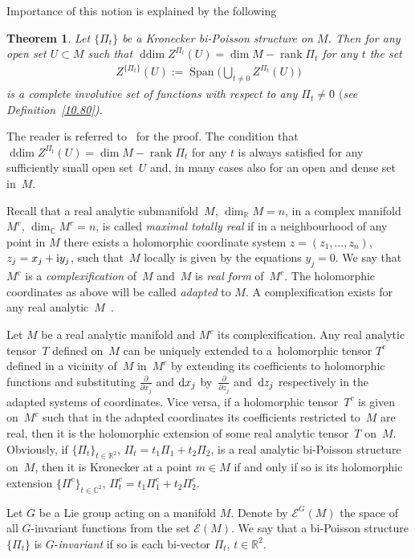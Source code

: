 \documentclass[pdftex]{sigma}
\numberwithin{equation}{section}
\newtheorem{Theorem}{Theorem}[section]
\begin{document}
Importance of this notion is explained by the following

\begin{Theorem}\label{prop}Let $\{\Pi_t\}$ be a Kronecker bi-Poisson structure on $M$. Then for any open set $U \subset M$ such that $\operatorname{ddim} Z^{\Pi_t}(U)=\dim M-\operatorname{rank} \Pi_t$ for any $t$ the set
\begin{gather*}
Z^{\{\Pi_t\}}(U):=\operatorname{Span}\bigg(\bigcup_{t\not=0}Z^{\Pi_t}(U)\bigg)
\end{gather*}
is a complete involutive set of functions with respect to any $\Pi_t\not =0$ $($see Definition~{\rm \ref{10.80})}.
\end{Theorem}
The reader is referred to~\cite{bols'} for the proof. The condition that $\operatorname{ddim} Z^{\Pi_t}(U)=\dim M-\operatorname{rank} \Pi_t$ for any $t$ is always satisfied for any sufficiently small open set~$U$ and, in many cases also for an open and dense set in~$M$.

\begin{Remark}\label{rem}Recall that a real analytic submanifold~$M$, $\dim_\mathbb{R} M=n$, in a complex manifold~${M}^c$, $\dim_\mathbb{C}{M}^c=n$, is called \emph{maximal totally real} if in a neighbourhood of any point in $M$ there exists a holomorphic coordinate system $z=(z_1,\dots,z_n)$, $z_j=x_j+{\rm i}y_j$, such that~$M$ locally is given by the equations $y_j=0$. We say that ${M}^c$ is a \emph{complexification} of~$M$ and~$M$ is \emph{real form} of~${M}^c$. The holomorphic coordinates as above will be called \emph{adapted} to $M$. A complexification exists for any real analytic~$M$~\cite{bw}.

Let $M$ be a real analytic manifold and ${M}^c$ its complexification. Any real analytic tensor~$T$ defined on~$M$ can be uniquely extended to a~holomorphic tensor ${T}^c$ defined in a vicinity of~$M$ in~${M}^c$ by extending its coefficients to holomorphic functions and substituting $\frac{\partial }{\partial x_j}$ and ${\rm d}x_j$ by~$\frac{\partial }{\partial z_j}$ and~${\rm d}z_j$ respectively in the adapted systems of coordinates. Vice versa, if a holomorphic tensor~${T}^c$ is given on~${M}^c$ such that in the adapted coordinates its coefficients restricted to~$M$ are real, then it is the holomorphic extension of some real analytic tensor~$T$ on~$M$. Obviously, if $\{\Pi_t\}_{t\in\mathbb{R}^2}$, $\Pi_t=t_1\Pi_1+t_2\Pi_2$, is a real analytic bi-Poisson structure on~$M$, then it is Kronecker at a point $m\in M$ if and only if so is its holomorphic extension $\{{\Pi}^c\}_{t\in\mathbb{C}^2}$, ${\Pi}^c_t=t_1{\Pi}^c_1+t_2 {\Pi}^c_2$.

\end{Remark}Let $G$ be a Lie group acting on a manifold $M$. Denote by $\mathcal{E}^G(M)$ the space of all $G$-invariant functions from the set ${\mathcal E}(M)$. We say that a bi-Poisson structure $\{\Pi_t\}$ is $G$-\emph{invariant} if so is each bi-vector $\Pi_t$, $t\in\mathbb{R}^2$.
\end{document}
